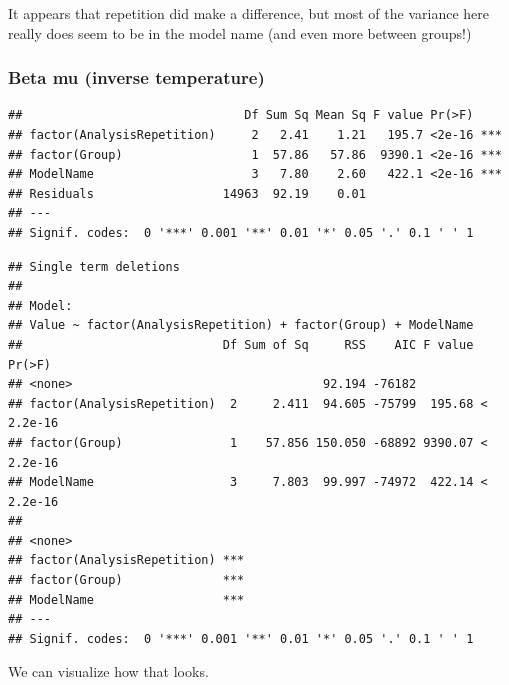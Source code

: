 \documentclass[]{article}
\begin{document}
It appears that repetition did make a difference, but most of the
variance here really does seem to be in the model name (and even more
between groups!)

\subsubsection{Beta mu (inverse
temperature)}\label{beta-mu-inverse-temperature}

\begin{verbatim}
##                               Df Sum Sq Mean Sq F value Pr(>F)    
## factor(AnalysisRepetition)     2   2.41    1.21   195.7 <2e-16 ***
## factor(Group)                  1  57.86   57.86  9390.1 <2e-16 ***
## ModelName                      3   7.80    2.60   422.1 <2e-16 ***
## Residuals                  14963  92.19    0.01                   
## ---
## Signif. codes:  0 '***' 0.001 '**' 0.01 '*' 0.05 '.' 0.1 ' ' 1
\end{verbatim}

\begin{verbatim}
## Single term deletions
## 
## Model:
## Value ~ factor(AnalysisRepetition) + factor(Group) + ModelName
##                            Df Sum of Sq     RSS    AIC F value    Pr(>F)
## <none>                                   92.194 -76182                  
## factor(AnalysisRepetition)  2     2.411  94.605 -75799  195.68 < 2.2e-16
## factor(Group)               1    57.856 150.050 -68892 9390.07 < 2.2e-16
## ModelName                   3     7.803  99.997 -74972  422.14 < 2.2e-16
##                               
## <none>                        
## factor(AnalysisRepetition) ***
## factor(Group)              ***
## ModelName                  ***
## ---
## Signif. codes:  0 '***' 0.001 '**' 0.01 '*' 0.05 '.' 0.1 ' ' 1
\end{verbatim}

We can visualize how that looks.
\end{document}
